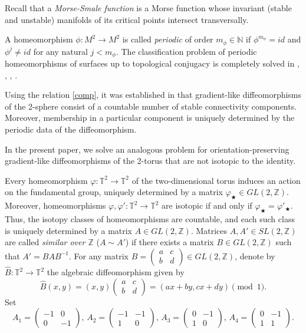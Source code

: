 \documentclass{amsart}
\numberwithin{equation}{section}
\begin{document}
	Recall that a {\it Morse-Smale function} is a Morse function whose invariant (stable and unstable) manifolds of its critical points intersect transversally.
	
	A homeomorphism $\phi :M^2 \rightarrow M^2$ is called {\it periodic} of order $m_\phi \in \mathbb{N}$ if $\phi^{m_\phi}=id$ and $\phi^j \neq id$ for any natural $j<m_\phi$. The classification problem of periodic homeomorphisms of surfaces up to topological conjugacy is completely solved in \cite{Nielsen37}, \cite{yoko}, \cite{yoko2}, \cite{yoko22}. 
	
	Using the relation \eqref{comp}, it was established in \cite{np2021} that gradient-like diffeomorphisms of the 2-sphere consist of a countable number of stable connectivity components. Moreover, membership in a particular component is uniquely determined by the periodic data of the diffeomorphism.
	
	In the present paper, we solve an analogous problem for orientation-preserving gradient-like diffeomorphisms of the 2-torus that are not isotopic to the identity.
	
	
	Every homeomorphism $\varphi:\mathbb T^2\to\mathbb T^2$ of the two-dimensional torus induces an action on the fundamental group, uniquely determined by a matrix $\varphi_\bigstar\in GL(2,\mathbb Z)$. Moreover, homeomorphisms $\varphi,\varphi':\mathbb T^2\to\mathbb T^2$ are isotopic if and only if $\varphi_\bigstar=\varphi'_\bigstar$. Thus, the isotopy classes of homeomorphisms are countable, and each such class is uniquely determined by a matrix $A\in GL(2,\mathbb Z)$. Matrices $A,A'\in SL(2,\mathbb Z)$ are called {\it similar over $\mathbb Z$} ($A\sim A'$) if there exists a matrix $B\in GL(2,\mathbb Z)$ such that $A'=BAB^{-1}$. For any matrix $B=\begin{pmatrix} a & c\\ b& d\end{pmatrix}\in GL(2,\mathbb Z)$, denote by $\widehat B:\mathbb T^2\to\mathbb T^2$ the algebraic diffeomorphism given by $$\widehat B(x,y)=(x,y)\begin{pmatrix} a & c\\ b& d\end{pmatrix}=(ax+by,cx+dy)\pmod 1.$$
	Set $$A_1=\begin{pmatrix} -1 & 0\\ 0& -1\end{pmatrix},\,A_2=\begin{pmatrix} -1 & -1\\ 1& 0\end{pmatrix},\,A_3=\begin{pmatrix} 0 & -1\\ 1& 0\end{pmatrix},\,A_4=\begin{pmatrix} 0 & -1\\ 1& 1\end{pmatrix}.$$ 
	
\end{document}
